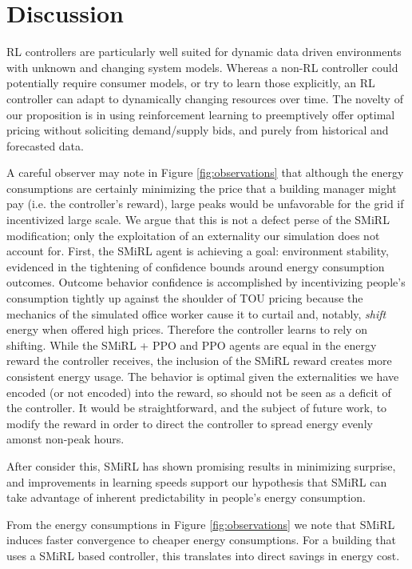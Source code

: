 \section{Discussion} \label{sec:discussion}

RL controllers are particularly well suited for dynamic data driven environments with unknown 
and changing system models. 
Whereas a non-RL controller could potentially require consumer models, 
or try to learn those explicitly, an RL controller can adapt to dynamically changing 
resources over time. 
The novelty of our proposition is in using reinforcement learning to preemptively 
offer optimal pricing without soliciting demand/supply bids, and purely from historical 
and forecasted data. 

A careful observer may note in Figure \ref{fig:observations} that although the energy consumptions are certainly minimizing the price that a building manager might pay (i.e. the controller's reward), large peaks would be unfavorable for the grid if incentivized large scale. We argue that this is not a defect perse of the SMiRL modification; only the exploitation of an externality our simulation does not account for. First, the SMiRL agent is achieving a goal: environment stability, evidenced in the tightening of confidence bounds around energy consumption outcomes. Outcome behavior confidence is accomplished by incentivizing people's consumption tightly up against the shoulder of TOU pricing because the mechanics of the simulated office worker cause it to curtail and, notably, \textit{shift} energy when offered high prices. Therefore the controller learns to rely on shifting. While the SMiRL + PPO and PPO agents are equal in the energy reward the controller receives, the inclusion of the SMiRL reward creates more consistent energy usage. The behavior is optimal given the externalities we have encoded (or not encoded) into the reward, so should not be seen as a deficit of the controller. It would be straightforward, and the subject of future work, to modify the reward in order to direct the controller to spread energy evenly amonst non-peak hours. 

After consider this, SMiRL has shown promising results in minimizing surprise, 
and improvements in learning speeds 
support our hypothesis that SMiRL can take advantage of inherent predictability in people's 
energy consumption. 

From the energy consumptions in Figure \ref{fig:observations} we note that SMiRL induces faster convergence
to cheaper energy consumptions. 
For a building that uses a SMiRL based controller, this translates into direct savings in 
energy cost. 

